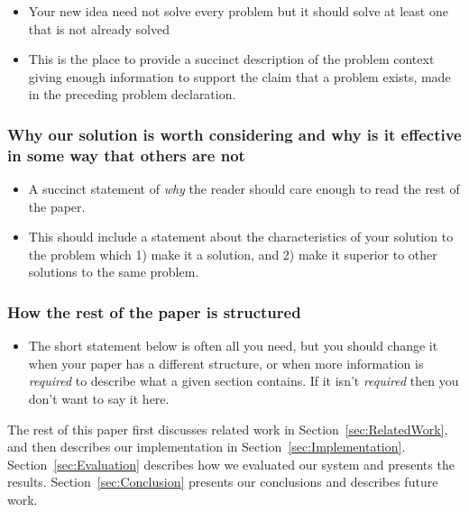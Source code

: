 \documentclass[11pt]{article}
\newcommand{\secref}[1]{Section~\ref{#1}}
\begin{document}
\begin{itemize}
\item
Your new idea need not solve every problem but it should solve at least one
that is not already solved

\item
This is the place to provide a succinct description of the problem context
giving enough information to support the claim that a problem exists, made in
the preceding problem declaration.

\end{itemize}


\subsubsection* {Why our solution is worth considering and why is it effective
in some way that others are not}

\begin{itemize}
\item
A succinct statement of {\em why} the reader should care enough to read the
rest of the paper.

\item
This should include a statement about the characteristics of your solution to
the problem which 1) make it a solution, and 2) make it superior to other
solutions to the same problem.

\end{itemize}


\subsubsection* {How the rest of the paper is structured}
\begin{itemize}
\item
The short statement below is often all you need, but you should change it when
your paper has a different structure, or when more information is {\em
required} to describe what a given section contains. If it isn't {\em required}
then you don't want to say it here.

\end{itemize}

The rest of this paper first discusses related work in
\secref{sec:RelatedWork}, and then describes our implementation in
\secref{sec:Implementation}. \secref{sec:Evaluation} describes how we evaluated
our system and presents the results. \secref{sec:Conclusion} presents our
conclusions and describes future work.
\end{document}
